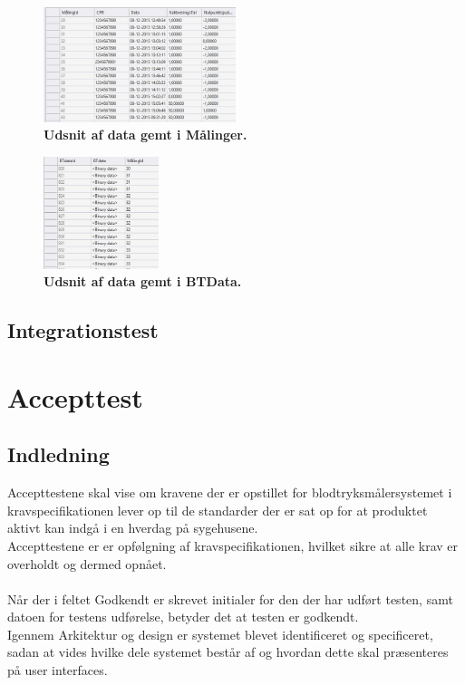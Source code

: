 \begin{figure}[H]
\includegraphics[width =0.5\textwidth , center]{billeder/database_data_gem}
\caption{\textbf{Udsnit af data gemt i Målinger.}}
\end{figure}
\begin{figure}[H]
\includegraphics[width =0.3\textwidth , center]{billeder/database_bt_gem}
\caption{\textbf{Udsnit af data gemt i BTData.}}
\end{figure}
\section{Integrationstest}

\chapter{Accepttest}
\section{Indledning}
Accepttestene skal vise om kravene der er opstillet for blodtryksmålersystemet i kravspecifikationen lever op til de standarder der er sat op for at produktet aktivt kan indgå i en hverdag på sygehusene.\\
Accepttestene er er opfølgning af kravspecifikationen, hvilket sikre at alle krav er overholdt og dermed opnået.\\\\
Når der i feltet Godkendt er skrevet initialer for den der har udført testen, samt datoen for testens udførelse, betyder det at testen er godkendt.  \\
Igennem Arkitektur og design er systemet blevet identificeret og specificeret, sadan at vides hvilke dele systemet består af og hvordan dette skal præsenteres på user interfaces.
